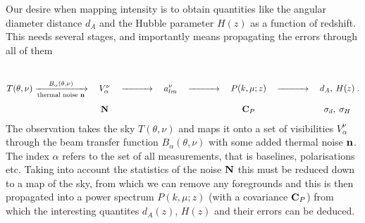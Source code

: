 \documentclass[onecolumn]{revtex4}
\begin{document}
\newcommand{\vlrarrow}{\ensuremath{\xrightarrow{\qquad\quad}}}

Our desire when mapping \tcm{} intensity is to obtain quantities like the
angular diameter distance $d_A$ and the Hubble parameter $H(z)$ as a function of
redshift. This needs several stages, and importantly means propagating the
errors through all of them
\begin{equation}
  T(\theta, \nu) \xrightarrow[\text{thermal noise }\vn]{B_\alpha(\theta,\nu)} \quad \begin{matrix} \\ \\V_\alpha^\nu \\ \\ \mN\end{matrix} \quad
  \vlrarrow \quad a_{lm}^\nu  \quad \vlrarrow \quad \begin{matrix} \\ \\P(k, \mu; z) \\ \\ \mC_P \end{matrix}  \quad \vlrarrow \quad \begin{matrix} \\ \\  d_A,\: H(z)  \\ \\ \sigma_d, \; \sigma_H \end{matrix} \; .
\end{equation}
The observation takes the sky $T(\theta, \nu)$ and maps it onto a set of
visibilities $V_\alpha^\nu$ through the beam transfer function $B_\alpha(\theta,
\nu)$ with some added thermal noise $\mathbf{n}$. The index $\alpha$ refers to the set
of all measurements, that is baselines, polarisations etc. Taking into account
the statistics of the noise $\mathbf{N}$ this must be reduced down to a map of the sky,
from which we can remove any foregrounds and this is then propagated into a
power spectrum $P(k, \mu; z)$ (with a covariance $\mathbf{C}_P$) from which the
interesting quantites $d_A(z)$, $H(z)$ and their errors can be deduced.
\end{document}
